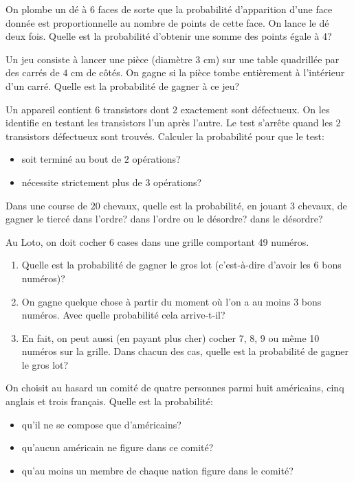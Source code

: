 \documentclass{yann}
\begin{document}
\Exercice

On plombe un dé à 6 faces de sorte que la probabilité d'apparition d'une face
donnée est proportionnelle au nombre de points de cette face.
On lance le dé deux fois.
Quelle est la probabilité d'obtenir une somme des points égale à 4?

\Exercice

Un jeu consiste à lancer une pièce (diamètre $3$ cm) sur une table
quadrillée par des carrés de $4$ cm de côtés.
On gagne si la pièce tombe entièrement à l'intérieur d'un carré.
Quelle est la probabilité de gagner à ce jeu?

\Exercice

Un appareil contient $6$ transistors dont $2$ exactement sont défectueux.
On les identifie en testant les transistors l'un après l'autre.
Le test s'arrête quand les $2$ transistors défectueux sont trouvés.
Calculer la probabilité pour que le test:
\begin{itemize}
\item
  soit terminé au bout de $2$ opérations?
\item
  nécessite strictement plus de $3$ opérations?
\end{itemize}

\Exercice

Dans une course de $20$ chevaux, quelle est la probabilité, en jouant
$3$ chevaux, de gagner le tiercé dans l'ordre?
dans l'ordre ou le désordre?
dans le désordre?

\Exercice

Au Loto, on doit cocher 6 cases dans une grille comportant 49 numéros.
\begin{enumerate}
\item
  Quelle est la probabilité de gagner le gros lot (c'est-à-dire d'avoir les 6 bons numéros)?
\item
  On gagne quelque chose à partir du moment où l'on a au moins 3 bons numéros.
  Avec quelle probabilité cela arrive-t-il?
\item
  En fait, on peut aussi (en payant plus cher) cocher 7, 8, 9 ou même 10 numéros
  sur la grille. Dans chacun des cas, quelle est la probabilité de gagner le
  gros lot?
\end{enumerate}

\Exercice

On choisit au hasard un comité de quatre personnes parmi huit américains, cinq anglais et trois français. Quelle est la probabilité:
\begin{itemize}
\item
  qu'il ne se compose que d'américains?
\item
  qu'aucun américain ne figure dans ce comité?
\item
  qu'au moins un membre de chaque nation figure dans le comité?
\end{itemize}
\end{document}

